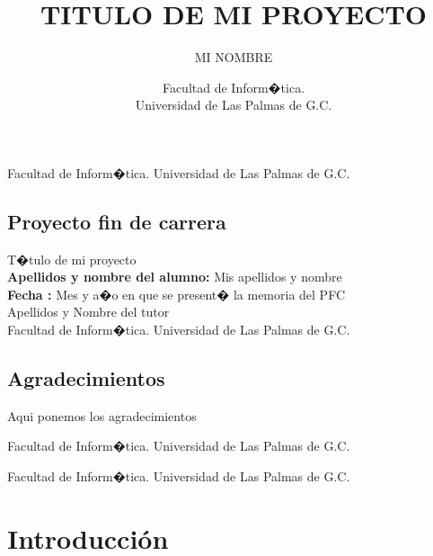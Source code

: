 \documentclass[12pt,letter,spanish]{book}
\begin{document}
\title{TITULO DE MI PROYECTO}
\author{MI NOMBRE}
\date{Facultad de Inform�tica.\\
        Universidad de Las Palmas de G.C.}

\thispagestyle{empty}
\maketitle

\thispagestyle{empty}
\noindent Facultad de Inform�tica. Universidad de Las Palmas de G.C.

\newpage
\thispagestyle{empty}
\section*{Proyecto fin de carrera}

\bigskip
{} T�tulo de mi proyecto\\
{\bf Apellidos y nombre del alumno: } Mis apellidos y nombre\\
{\bf Fecha :  } Mes y a�o en que se present� la memoria del PFC \\

\vspace{2cm}
 Apellidos y Nombre del tutor \\

\newpage
\thispagestyle{empty}
\noindent Facultad de Inform�tica. Universidad de Las Palmas de G.C.
\newpage

\newpage
\thispagestyle{empty}
\section*{Agradecimientos}
  Aqui ponemos los agradecimientos

\newpage
\thispagestyle{empty}
\noindent Facultad de Inform�tica. Universidad de Las Palmas de G.C.
\newpage
\setcounter{page}{1}
\tableofcontents

\newpage
\thispagestyle{empty}
\noindent Facultad de Inform�tica. Universidad de Las Palmas de G.C.
\newpage



\chapter{Introducci\'on}
\end{document}
